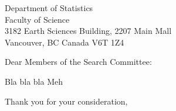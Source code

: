 \documentclass[10pt]{letter}
\begin{document}
\begin{letter}{
    Department of Statistics
    \\
    Faculty of Science
    \\
    3182 Earth Sciences Building, 2207 Main Mall
    \\
    Vancouver, BC Canada V6T 1Z4
}
\opening{Dear Members of the Search Committee:}

Bla bla bla
\newpage
Meh

\closing{Thank you for your consideration,}

\end{letter}
\end{document}
